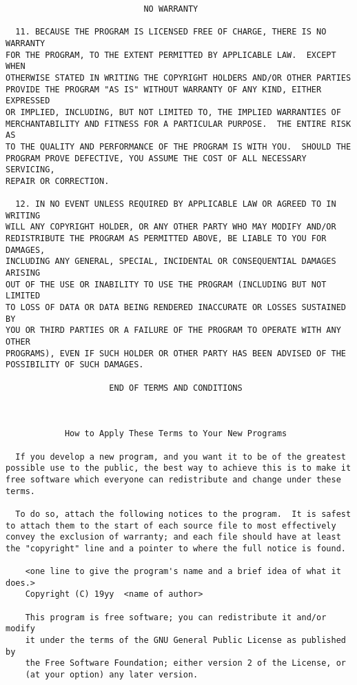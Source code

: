 \documentclass{article}
\begin{document}
\begin{appendix}
\begin{verbatim}
                            NO WARRANTY

  11. BECAUSE THE PROGRAM IS LICENSED FREE OF CHARGE, THERE IS NO WARRANTY
FOR THE PROGRAM, TO THE EXTENT PERMITTED BY APPLICABLE LAW.  EXCEPT WHEN
OTHERWISE STATED IN WRITING THE COPYRIGHT HOLDERS AND/OR OTHER PARTIES
PROVIDE THE PROGRAM "AS IS" WITHOUT WARRANTY OF ANY KIND, EITHER EXPRESSED
OR IMPLIED, INCLUDING, BUT NOT LIMITED TO, THE IMPLIED WARRANTIES OF
MERCHANTABILITY AND FITNESS FOR A PARTICULAR PURPOSE.  THE ENTIRE RISK AS
TO THE QUALITY AND PERFORMANCE OF THE PROGRAM IS WITH YOU.  SHOULD THE
PROGRAM PROVE DEFECTIVE, YOU ASSUME THE COST OF ALL NECESSARY SERVICING,
REPAIR OR CORRECTION.

  12. IN NO EVENT UNLESS REQUIRED BY APPLICABLE LAW OR AGREED TO IN WRITING
WILL ANY COPYRIGHT HOLDER, OR ANY OTHER PARTY WHO MAY MODIFY AND/OR
REDISTRIBUTE THE PROGRAM AS PERMITTED ABOVE, BE LIABLE TO YOU FOR DAMAGES,
INCLUDING ANY GENERAL, SPECIAL, INCIDENTAL OR CONSEQUENTIAL DAMAGES ARISING
OUT OF THE USE OR INABILITY TO USE THE PROGRAM (INCLUDING BUT NOT LIMITED
TO LOSS OF DATA OR DATA BEING RENDERED INACCURATE OR LOSSES SUSTAINED BY
YOU OR THIRD PARTIES OR A FAILURE OF THE PROGRAM TO OPERATE WITH ANY OTHER
PROGRAMS), EVEN IF SUCH HOLDER OR OTHER PARTY HAS BEEN ADVISED OF THE
POSSIBILITY OF SUCH DAMAGES.

                     END OF TERMS AND CONDITIONS



            How to Apply These Terms to Your New Programs

  If you develop a new program, and you want it to be of the greatest
possible use to the public, the best way to achieve this is to make it
free software which everyone can redistribute and change under these terms.

  To do so, attach the following notices to the program.  It is safest
to attach them to the start of each source file to most effectively
convey the exclusion of warranty; and each file should have at least
the "copyright" line and a pointer to where the full notice is found.

    <one line to give the program's name and a brief idea of what it does.>
    Copyright (C) 19yy  <name of author>

    This program is free software; you can redistribute it and/or modify
    it under the terms of the GNU General Public License as published by
    the Free Software Foundation; either version 2 of the License, or
    (at your option) any later version.


\end{verbatim}
\end{appendix}
\end{document}
